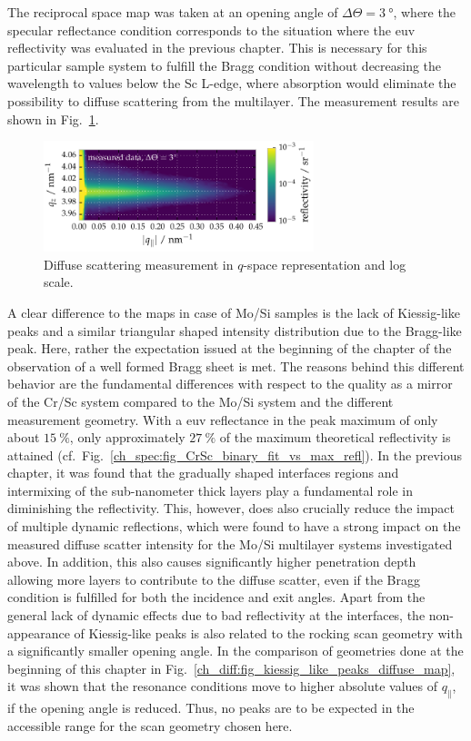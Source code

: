 The reciprocal space map was taken at an opening angle of $\Delta \Theta = \SI{3}{\degree}$, where the specular reflectance condition corresponds to the situation where the \gls{euv} reflectivity was evaluated in the previous chapter. This is necessary for this particular sample system to fulfill the Bragg condition without decreasing the wavelength to values below the Sc L-edge, where absorption would eliminate the possibility to diffuse scattering from the multilayer. The measurement results are shown in Fig.~\ref{ch_diff:fig_CrSc_diffuse_meas}.
\begin{figure}[htbp]
  \centering
  \includegraphics[width=0.7\textwidth]{img/CrSc_diffuse_measured}
  \caption{Diffuse scattering measurement in $q$-space representation and 
log scale.}
  \label{ch_diff:fig_CrSc_diffuse_meas}
\end{figure}
A clear difference to the maps in case of Mo/Si samples is the lack of Kiessig-like peaks and a similar triangular shaped intensity distribution due to the Bragg-like peak. Here, rather the expectation issued at the beginning of the chapter of the observation of a well formed Bragg sheet is met. The reasons behind this different behavior are the fundamental differences with respect to the quality as a mirror of the Cr/Sc system compared to the Mo/Si system and the different measurement geometry. With a \gls{euv} reflectance in the peak maximum of only about $\SI{15}{\percent}$, only approximately $\SI{27}{\percent}$ of the maximum theoretical reflectivity is attained (cf.~Fig.~\ref{ch_spec:fig_CrSc_binary_fit_vs_max_refl}). In the previous chapter, it was found that the gradually shaped interfaces regions and intermixing of the sub-nanometer thick layers play a fundamental role in diminishing the reflectivity. This, however, does also crucially reduce the impact of multiple dynamic reflections, which were found to have a strong impact on the measured diffuse scatter intensity for the Mo/Si multilayer systems investigated above. In addition, this also causes significantly higher penetration depth allowing more layers to contribute to the diffuse scatter, even if the Bragg condition is fulfilled for both the incidence and exit angles. Apart from the general lack of dynamic effects due to bad reflectivity at the interfaces, the non-appearance of Kiessig-like peaks is also related to the rocking scan geometry with a significantly smaller opening angle. In the comparison of geometries done at the beginning of this chapter in Fig.~\ref{ch_diff:fig_kiessig_like_peaks_diffuse_map}, it was shown that the resonance conditions move to higher absolute values of $q_\parallel$, if the opening angle is reduced. Thus, no peaks are to be expected in the accessible range for the scan geometry chosen here.

